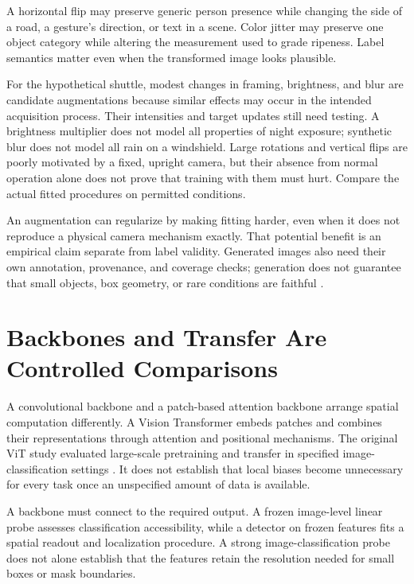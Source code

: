 A horizontal flip may preserve generic person presence while changing the side of a road, a gesture's direction, or text in a scene. Color jitter may preserve one object category while altering the measurement used to grade ripeness. Label semantics matter even when the transformed image looks plausible.

For the hypothetical shuttle, modest changes in framing, brightness, and blur are candidate augmentations because similar effects may occur in the intended acquisition process. Their intensities and target updates still need testing. A brightness multiplier does not model all properties of night exposure; synthetic blur does not model all rain on a windshield. Large rotations and vertical flips are poorly motivated by a fixed, upright camera, but their absence from normal operation alone does not prove that training with them must hurt. Compare the actual fitted procedures on permitted conditions.

An augmentation can regularize by making fitting harder, even when it does not reproduce a physical camera mechanism exactly. That potential benefit is an empirical claim separate from label validity. Generated images also need their own annotation, provenance, and coverage checks; generation does not guarantee that small objects, box geometry, or rare conditions are faithful \citep{ho2020ddpm,rombach2022}.

\section{Backbones and Transfer Are Controlled Comparisons}

A convolutional backbone and a patch-based attention backbone arrange spatial computation differently. A Vision Transformer embeds patches and combines their representations through attention and positional mechanisms. The original ViT study evaluated large-scale pretraining and transfer in specified image-classification settings \citep{dosovitskiy2021vit}. It does not establish that local biases become unnecessary for every task once an unspecified amount of data is available.

A backbone must connect to the required output. A frozen image-level linear probe assesses classification accessibility, while a detector on frozen features fits a spatial readout and localization procedure. A strong image-classification probe does not alone establish that the features retain the resolution needed for small boxes or mask boundaries.

